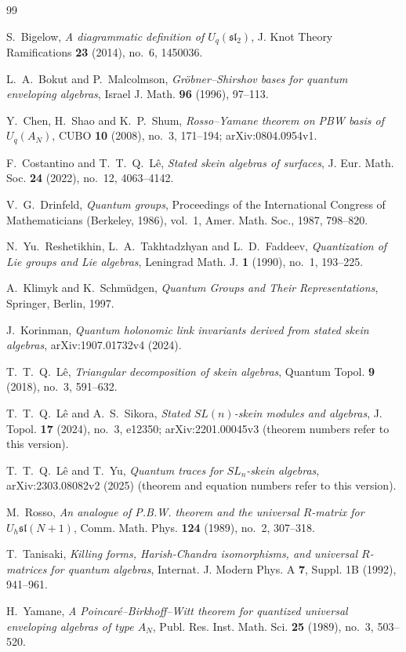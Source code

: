 \documentclass[12pt]{article}
\theoremstyle{remark}
\begin{document}
\begin{thebibliography}{99}

S.~Bigelow,
\emph{A diagrammatic definition of $U_q(\mathfrak{sl}_2)$},
J. Knot Theory Ramifications \textbf{23} (2014), no.~6, 1450036.

L.~A.~Bokut and P.~Malcolmson,
\emph{Gr\"obner--Shirshov bases for quantum enveloping algebras},
Israel J. Math. \textbf{96} (1996), 97--113.

Y.~Chen, H.~Shao and K.~P.~Shum,
\emph{Rosso--Yamane theorem on PBW basis of $U_q(A_N)$},
CUBO \textbf{10} (2008), no.~3, 171--194; arXiv:0804.0954v1.

F.~Costantino and T.~T.~Q.~L\^e,
\emph{Stated skein algebras of surfaces},
J. Eur. Math. Soc. \textbf{24} (2022), no.~12, 4063--4142.

V.~G.~Drinfeld,
\emph{Quantum groups},
Proceedings of the International Congress of Mathematicians (Berkeley,
1986), vol.~1, Amer. Math. Soc., 1987, 798--820.

N.~Yu.~Reshetikhin, L.~A.~Takhtadzhyan and L.~D.~Faddeev,
\emph{Quantization of Lie groups and Lie algebras},
Leningrad Math. J. \textbf{1} (1990), no.~1, 193--225.

A.~Klimyk and K.~Schm\"udgen,
\emph{Quantum Groups and Their Representations},
Springer, Berlin, 1997.

J.~Korinman,
\emph{Quantum holonomic link invariants derived from stated skein
algebras}, arXiv:1907.01732v4 (2024).

T.~T.~Q.~L\^e,
\emph{Triangular decomposition of skein algebras},
Quantum Topol. \textbf{9} (2018), no.~3, 591--632.

T.~T.~Q.~L\^e and A.~S.~Sikora,
\emph{Stated $SL(n)$-skein modules and algebras},
J. Topol. \textbf{17} (2024), no.~3, e12350; arXiv:2201.00045v3
(theorem numbers refer to this version).

T.~T.~Q.~L\^e and T.~Yu,
\emph{Quantum traces for $SL_n$-skein algebras},
arXiv:2303.08082v2 (2025) (theorem and equation numbers refer to this
version).

M.~Rosso,
\emph{An analogue of P.B.W. theorem and the universal $R$-matrix for
$U_h\mathfrak{sl}(N+1)$},
Comm. Math. Phys. \textbf{124} (1989), no.~2, 307--318.

T.~Tanisaki,
\emph{Killing forms, Harish-Chandra isomorphisms, and universal
$R$-matrices for quantum algebras},
Internat. J. Modern Phys. A \textbf{7}, Suppl. 1B (1992), 941--961.

H.~Yamane,
\emph{A Poincar\'e--Birkhoff--Witt theorem for quantized universal
enveloping algebras of type $A_N$},
Publ. Res. Inst. Math. Sci. \textbf{25} (1989), no.~3, 503--520.

\end{thebibliography}
\end{document}
